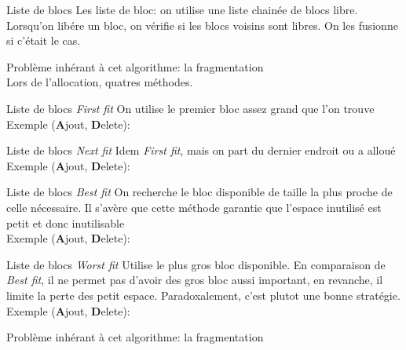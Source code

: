 \begin{frame}{Liste de blocs}
  Les  liste  de   bloc:  on  utilise  une  liste   chainée  de  blocs
  libre. Lorsqu'on  libére un  bloc, on vérifie  si les  blocs voisins
  sont libres.  On les fusionne si c'était le cas.
  \begin{center}
  \end{center}
  Problème inhérant à cet algorithme: la fragmentation
  \\[2ex]
  Lors  de l'allocation, quatres méthodes.
\end{frame}

\begin{frame}{Liste de blocs}
  \emph{First fit}  On utilise  le premier bloc  assez grand  que l'on
  trouve
  \\
  Exemple (\textbf{A}jout, \textbf{D}elete):
  \begin{center}
  \end{center}
\end{frame}

\begin{frame}{Liste de blocs}
  \emph{Next  fit} Idem  \emph{First  fit}, mais  on  part du  dernier
  endroit ou a alloué
  \\
  Exemple (\textbf{A}jout, \textbf{D}elete):
  \begin{center}
  \end{center}
\end{frame}

\begin{frame}{Liste de blocs}
  \emph{Best fit}  On recherche le  bloc disponible de taille  la plus
  proche de  celle nécessaire.  Il s'avère que  cette méthode garantie
  que l'espace inutilisé est petit et donc inutilisable
  \\
  Exemple (\textbf{A}jout, \textbf{D}elete):
  \begin{center}
  \end{center}
\end{frame}

\begin{frame}{Liste de blocs}
  \emph{Worst  fit}   Utilise  le   plus  gros  bloc   disponible.  En
  comparaison de  \emph{Best fit}, il  ne permet pas d'avoir  des gros
  bloc  aussi important,  en revanche,  il limite  la perte  des petit
  espace.  Paradoxalement, c'est plutot une bonne stratégie.
  \\
  Exemple (\textbf{A}jout, \textbf{D}elete):
  \begin{center}
  \end{center}
   Problème inhérant à cet algorithme: la fragmentation
\end{frame}

